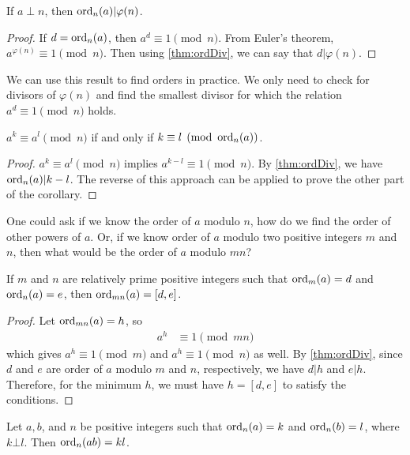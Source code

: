 \documentclass{subfile}
\begin{document}
	\begin{corollary}\label{cor:phiDiv}
		If $a\perp n$, then $\operatorname{ord}_n(a)|\varphi (n)$.
	\end{corollary}

	\begin{proof}
		If $d=\operatorname{ord}_n(a)$, then $a^d\equiv1\pmod n$. From Euler's theorem, $a^{\varphi (n)}\equiv1\pmod n$. Then using \autoref{thm:ordDiv}, we can say that $d|\varphi (n)$.
	\end{proof}
We can use this result to find orders in practice. We only need to check for divisors of $\varphi(n)$ and find the smallest divisor for which the relation $a^d\equiv1\pmod n$ holds.
	\begin{corollary}
		$a^k\equiv a^l\pmod n$ if and only if $k\equiv l\pmod{\operatorname{ord}_n(a)}$.
	\end{corollary}

	\begin{proof}
		$a^k\equiv a^l\pmod n$ implies $a^{k-l} \equiv 1 \pmod n$. By \autoref{thm:ordDiv}, we have $\operatorname{ord}_n(a) | k-l$. The reverse of this approach can be applied to prove the other part of the corollary.
	\end{proof}
One could ask if we know the order of $a$ modulo $n$, how do we find the order of other powers of $a$. Or, if we know order of $a$ modulo two positive integers $m$ and $n$, then what would be the order of $a$ modulo $mn$?
	\begin{theorem}
		If $m$ and $n$ are relatively prime positive integers such that $\operatorname{ord}_m(a)=d$ and $\operatorname{ord}_n(a)=e$, then $\operatorname{ord}_{mn}(a)=[d,e]$.\label{thm:ordL}
	\end{theorem}

	\begin{proof}
		Let $\operatorname{ord}_{mn}(a)=h$, so
			\begin{align*}
				a^h
					& \equiv1\pmod {mn}
			\end{align*}
		which gives $a^h\equiv1\pmod m$ and $a^h\equiv1\pmod n$ as well. By \autoref{thm:ordDiv}, since $d$ and $e$ are order of $a$ modulo $m$ and $n$, respectively, we have $d|h$ and $e|h$. Therefore, for the minimum $h$, we must have $h=[d,e]$ to satisfy the conditions.
	\end{proof}

	\begin{theorem}\label{thm:prproduct}
		Let $a,b$, and $n$ be positive integers such that $\operatorname{ord}_n(a)=k$ and $\operatorname{ord}_n(b)=l$, where $k\bot l$. Then $\operatorname{ord}_n(ab)=kl$.
	\end{theorem}
\end{document}
